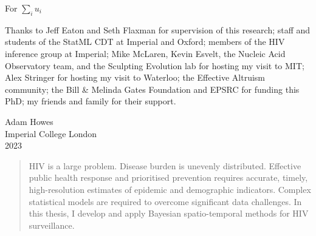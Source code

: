 \documentclass[a4paper, nobind]{templates/ociamthesis}
\begin{document}

\begin{romanpages}

\maketitle

\begin{dedication}
  For \(\sum_i u_i\)
\end{dedication}

\begin{acknowledgements}
 	Thanks to Jeff Eaton and Seth Flaxman for supervision of this research;
 staff and students of the StatML CDT at Imperial and Oxford;
 members of the HIV inference group at Imperial;
 Mike McLaren, Kevin Esvelt, the Nucleic Acid Observatory team, and the Sculpting Evolution lab for hosting my visit to MIT;
 Alex Stringer for hosting my visit to Waterloo;
 the Effective Altruism community;
 the Bill \& Melinda Gates Foundation and EPSRC for funding this PhD;
 my friends and family for their support.

 \begin{flushright}
 Adam Howes \\
 Imperial College London\\
 2023
 \end{flushright}
\end{acknowledgements}


\begin{abstract}
	HIV is a large problem.
Disease burden is unevenly distributed.
Effective public health response and prioritised prevention requires accurate, timely, high-resolution estimates of epidemic and demographic indicators.
Complex statistical models are required to overcome significant data challenges.
In this thesis, I develop and apply Bayesian spatio-temporal methods for HIV surveillance.
\end{abstract}


\end{romanpages}
\end{document}
